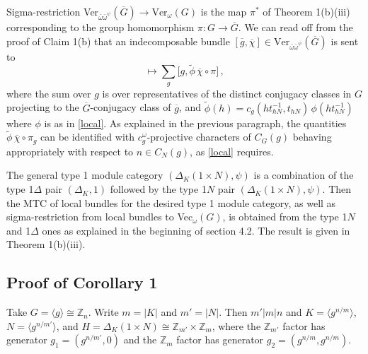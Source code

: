 \documentclass[12pt]{article}
\numberwithin{equation}{section}
\def\bbZ           {\mathbb{Z}}
\begin{document}
Sigma-restriction Ver$_{\bar{\omega}\bar{\omega}^\psi}(\overline{G})\rightarrow \mathrm{Ver}_\omega (G)$ is the map $\pi^*$ of Theorem 1(b)(iii)
corresponding to the group homomorphism $\pi:G\rightarrow \overline{G}$. We can read off from the proof of Claim 1(b) that 
an indecomposable bundle $ [\overline{g},\overline{\chi}]\in\mathrm{Ver}_{\bar{\omega}\bar{\omega}^\psi}(\overline{G})$ is sent to
\begin{equation}[\overline{g},\overline{\chi}]\mapsto \sum_{{g}}\bigl[{g},{\widetilde{\phi}}\,\overline{\chi}\circ\pi\bigr]\,,
\label{sigma2i}\end{equation}
where  the sum over $g$ is over representatives of the distinct conjugacy classes in $G$ projecting to the $\overline{G}$-conjugacy 
class of $\overline{g}$, and $\widetilde{\phi}(h)=c_g(ht^{-1}_{hN},t_{hN})\,\phi(ht^{-1}_{hN})$ where $\phi$ is
as in \eqref{local}. As explained in the previous paragraph, the quantities 
${\widetilde{\phi}}\,\overline{\chi}\circ\pi_{{g}}$
can be identified with $c_g^\omega$-projective characters of $C_G(g)$ behaving  appropriately with respect to $n\in C_N(g)$, as
 \eqref{local} requires.

The general type 1 module category $(\Delta_K(1\times N),\psi)$ is a combination of the
type 1$\Delta$ pair $(\Delta_K,1)$ followed by the type 1$N$ pair  $(\Delta_K(1\times N),\psi)$. Then the MTC of 
local bundles for the desired type 1 module category, as well as sigma-restriction from
local bundles to Vec$_\omega(G)$, is obtained from the type 1$N$ and 1$\Delta$ ones as explained
in the beginning of section 4.2. The result is given in Theorem 1(b)(iii).



\subsection{Proof of Corollary 1}

Take $G=\langle g\rangle\cong\bbZ_n$. Write $m=|K|$ and $m'=|N|$. Then $m'|m|n$ and $K=\langle
g^{n/m}\rangle$, $N=\langle g^{n/m'}\rangle$, and $H=\Delta_K(1\times N)\cong \bbZ_{m'}\times
\bbZ_{m}$, where the $\bbZ_{m'}$ factor has generator $g_1=(g^{n/m'},0)$ and the $\bbZ_m$ factor
has generator $g_2=(g^{n/m},g^{n/m})$.
\end{document}
